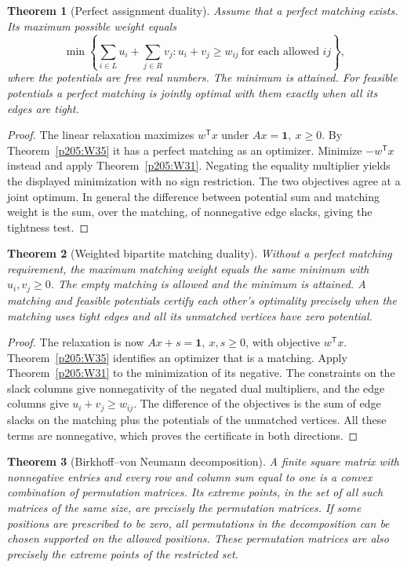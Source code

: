 \documentclass[11pt,oneside,openany]{book}
\theoremstyle{plain}
\newtheorem{theorem}{Theorem}[chapter]
\theoremstyle{definition}
\theoremstyle{remark}
\begin{document}
\begin{theorem}[Perfect assignment duality]\label{p205:W40}
Assume that a perfect matching exists. Its maximum possible weight
equals
\[
   \min\left\{\sum_{i\in L}u_i+\sum_{j\in R}v_j:
          u_i+v_j\ge w_{ij}\ \text{for each allowed }ij\right\},
\]
where the potentials are free real numbers. The minimum is attained.
For feasible potentials a perfect matching is jointly optimal with
them exactly when all its edges are tight.
\end{theorem}

\begin{proof}
The linear relaxation maximizes \(w^{\mathsf T}x\) under \(Ax=\mathbf
1,\ x\ge0\). By Theorem~\ref{p205:W35} it has a perfect matching
as an optimizer. Minimize \(-w^{\mathsf T}x\) instead and apply
Theorem~\ref{p205:W31}. Negating the equality multiplier yields
the displayed minimization with no sign restriction. The two
objectives agree at a joint optimum. In general the difference
between potential sum and matching weight is the sum, over the
matching, of nonnegative edge slacks, giving the tightness test.
\end{proof}

\begin{theorem}[Weighted bipartite matching duality]\label{p205:W41}
Without a perfect matching requirement, the maximum matching weight
equals the same minimum with \(u_i,v_j\ge0\). The empty matching is
allowed and the minimum is attained. A matching and feasible
potentials certify each other's optimality precisely when the
matching uses tight edges and all its unmatched vertices have
zero potential.
\end{theorem}

\begin{proof}
The relaxation is now \(Ax+s=\mathbf 1,\ x,s\ge0\), with objective
\(w^{\mathsf T}x\). Theorem~\ref{p205:W35} identifies an optimizer
that is a matching. Apply Theorem~\ref{p205:W31} to the minimization
of its negative. The constraints on the slack columns give
nonnegativity of the negated dual multipliers, and the edge columns
give \(u_i+v_j\ge w_{ij}\). The difference of the objectives is
the sum of edge slacks on the matching plus the potentials of the
unmatched vertices. All these terms are nonnegative, which proves
the certificate in both directions.
\end{proof}

\begin{theorem}[Birkhoff--von Neumann decomposition]\label{p205:W42}
A finite square matrix with nonnegative entries and every row and
column sum equal to one is a convex combination of permutation
matrices. Its extreme points, in the set of all such matrices of the
same size, are precisely the permutation matrices. If some positions
are prescribed to be zero, all permutations in the decomposition
can be chosen supported on the allowed positions. These permutation
matrices are also precisely the extreme points of the restricted set.
\end{theorem}
\end{document}
